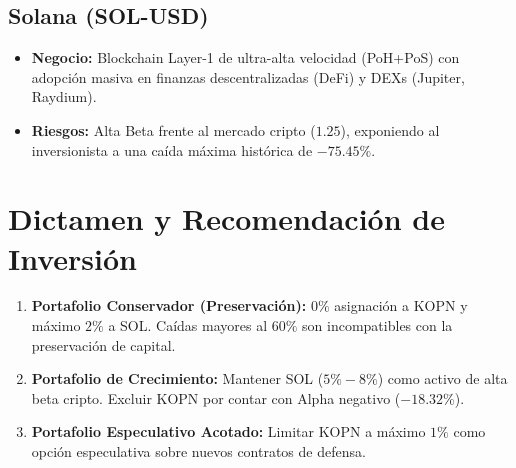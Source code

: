 \documentclass[11pt,a4paper]{article}
\begin{document}
\subsection{Solana (SOL-USD)}
\begin{itemize}
    \item \textbf{Negocio:} Blockchain Layer-1 de ultra-alta velocidad (PoH+PoS) con adopción masiva en finanzas descentralizadas (DeFi) y DEXs (Jupiter, Raydium).
    \item \textbf{Riesgos:} Alta Beta frente al mercado cripto ($1.25$), exponiendo al inversionista a una caída máxima histórica de $-75.45\%$.
\end{itemize}

\section{Dictamen y Recomendación de Inversión}
\begin{enumerate}
    \item \textbf{Portafolio Conservador (Preservación):} $0\%$ asignación a KOPN y máximo $2\%$ a SOL. Caídas mayores al $60\%$ son incompatibles con la preservación de capital.
    \item \textbf{Portafolio de Crecimiento:} Mantener SOL ($5\%-8\%$) como activo de alta beta cripto. Excluir KOPN por contar con Alpha negativo ($-18.32\%$).
    \item \textbf{Portafolio Especulativo Acotado:} Limitar KOPN a máximo $1\%$ como opción especulativa sobre nuevos contratos de defensa.
\end{enumerate}
\end{document}
